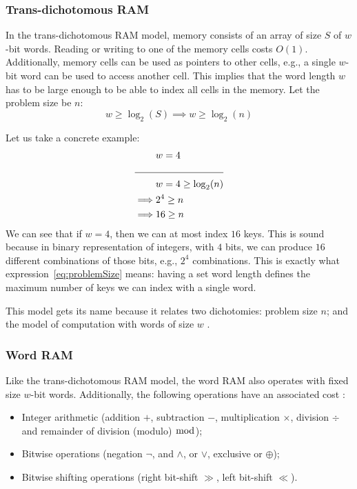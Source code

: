 \subsubsection{Trans-dichotomous RAM} \label{sec:transdichotomousRAM}
In the trans-dichotomous RAM model, memory consists of an array of size $S$ of $w$-bit words.
Reading or writing to one of the memory cells costs $O(1)$.
Additionally, memory cells can be used as pointers to other cells, e.g., a single $w$-bit word can be used to access another cell.
This implies that the word length $w$ has to be large enough to be able to index all cells in the memory.
Let the problem size be $n$:
\begin{equation} \label{eq:problemSize}
    w \ge \log_2(S) \implies w \ge \log_2(n)
\end{equation}

Let us take a concrete example:
\begin{align*}
    &w = 4 \\
    \cline{1-2}
    &w = 4 \geq \log_2(n) \\
    \implies &2^4 \geq n \\
    \implies &16 \geq n
\end{align*}
We can see that if $w = 4$, then we can at most index $16$ keys. This is sound because in binary representation of integers, with $4$ bits, we can produce $16$ different combinations of those bits, e.g., $2^4$ combinations. This is exactly what expression~\ref{eq:problemSize} means: having a set word length defines the maximum number of keys we can index with a single word.

This model gets its name because it relates two dichotomies: problem size $n$; and the model of computation with words of size $w$ \cite{erikdemainelec11}. 

\subsubsection{Word RAM}
Like the trans-dichotomous RAM model, the word RAM also operates with fixed size $w$-bit words. Additionally, the following operations have an associated cost \cite{nelsonjelanilec1}:
\begin{itemize}
    \item Integer arithmetic (addition $+$, subtraction $-$, multiplication $\times$, division $\div$ and remainder of division (modulo) $\bmod$);
    \item Bitwise operations (negation $\neg$, and $\wedge$, or $\vee$, exclusive or $\oplus$);
    \item Bitwise shifting operations (right bit-shift $\gg$, left bit-shift $\ll$).
\end{itemize}

